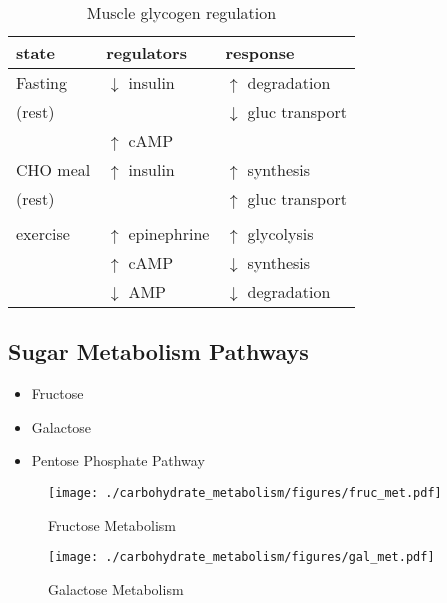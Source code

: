 \documentclass{scrartcl}
\begin{document}
\begin{table}[htbp]
\caption{\label{tab:org0ac51c5}
Muscle glycogen regulation}
\centering
\begin{tabular}{lll}
state & regulators & response\\
\hline
Fasting & \(\downarrow\) insulin & \(\uparrow\) degradation\\
(rest) &  & \(\downarrow\) gluc transport\\
 & \(\uparrow\) cAMP & \\
CHO meal & \(\uparrow\) insulin & \(\uparrow\) synthesis\\
(rest) &  & \(\uparrow\) gluc transport\\
 &  & \\
exercise & \(\uparrow\) epinephrine & \(\uparrow\) glycolysis\\
 & \(\uparrow\) cAMP & \(\downarrow\) synthesis\\
 & \(\downarrow\) AMP & \(\downarrow\) degradation\\
\end{tabular}
\end{table}

\subsection{Sugar Metabolism Pathways}
\label{sec:org94ed647}
\begin{itemize}
\item Fructose
\item Galactose
\item Pentose Phosphate Pathway
\end{itemize}

\begin{figure}[htbp]
\centering
\texttt{[image: ./carbohydrate\_metabolism/figures/fruc\_met.pdf]}
\caption{\label{fig:orga878a3f}
Fructose Metabolism}
\end{figure}

\begin{figure}[htbp]
\centering
\texttt{[image: ./carbohydrate\_metabolism/figures/gal\_met.pdf]}
\caption{\label{fig:orgb7a5cb5}
Galactose Metabolism}
\end{figure}
\end{document}
